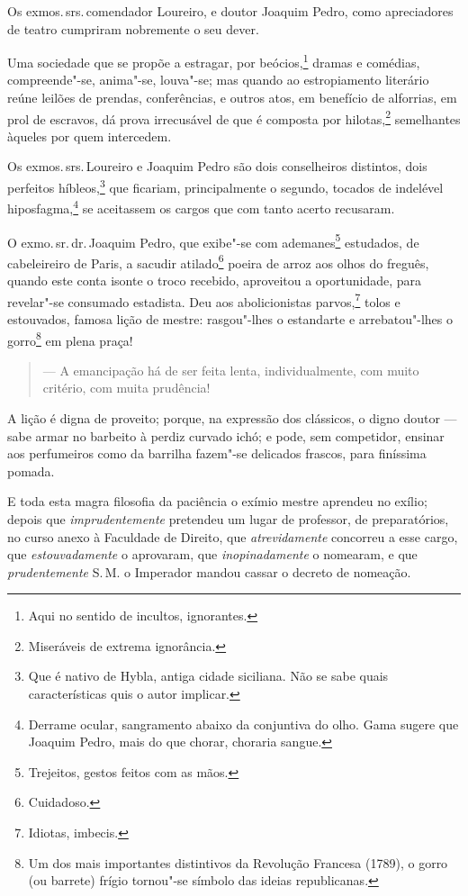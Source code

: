 Os exmos.\,srs.\,comendador Loureiro, e doutor Joaquim Pedro, como
apreciadores de teatro cumpriram nobremente o seu dever.

Uma sociedade que se propõe a estragar, por beócios,\footnote{Aqui no
  sentido de incultos, ignorantes.} dramas e comédias, compreende"-se,
anima"-se, louva"-se; mas quando ao estropiamento literário reúne leilões
de prendas, conferências, e outros atos, em benefício de alforrias, em
prol de escravos, dá prova irrecusável de que é composta por
hilotas,\footnote{Miseráveis de extrema ignorância.} semelhantes
àqueles por quem intercedem.

Os exmos.\,srs.\,Loureiro e Joaquim Pedro são dois conselheiros distintos,
dois perfeitos híbleos,\footnote{Que é nativo de Hybla, antiga cidade
  siciliana. Não se sabe quais características quis o autor implicar.}
que ficariam, principalmente o segundo, tocados de indelével
hiposfagma,\footnote{Derrame ocular, sangramento abaixo da conjuntiva
  do olho. Gama sugere que Joaquim Pedro, mais do que chorar, choraria
  sangue.} se aceitassem os cargos que com tanto acerto recusaram.

O exmo.\,sr.\,dr.\,Joaquim Pedro, que exibe"-se com ademanes\footnote{
  Trejeitos, gestos feitos com as mãos.} estudados, de cabeleireiro de
Paris, a sacudir atilado\footnote{Cuidadoso.} poeira de arroz aos
olhos do freguês, quando este conta isonte o troco recebido, aproveitou
a oportunidade, para revelar"-se consumado estadista. Deu aos
abolicionistas parvos,\footnote{Idiotas, imbecis.} tolos e estouvados,
famosa lição de mestre: rasgou"-lhes o estandarte e arrebatou"-lhes o
gorro\footnote{Um dos mais importantes distintivos da Revolução
  Francesa (1789), o gorro (ou barrete) frígio tornou"-se símbolo das
  ideias republicanas.} em plena praça!

\begin{quote}
--- A emancipação há de ser feita lenta, individualmente, com muito
critério, com muita prudência!
\end{quote}

A lição é digna de proveito; porque, na expressão dos clássicos, o digno
doutor --- sabe armar no barbeito à perdiz curvado ichó; e pode, sem
competidor, ensinar aos perfumeiros como da barrilha fazem"-se delicados
frascos, para finíssima pomada.

E toda esta magra filosofia da paciência o exímio mestre aprendeu no
exílio; depois que \emph{imprudentemente} pretendeu um lugar de
professor, de preparatórios, no curso anexo à Faculdade de Direito, que
\emph{atrevidamente} concorreu a esse cargo, que \emph{estouvadamente} o
aprovaram, que \emph{inopinadamente} o nomearam, e que
\emph{prudentemente} S.\,M. o Imperador mandou cassar o decreto de
nomeação.


